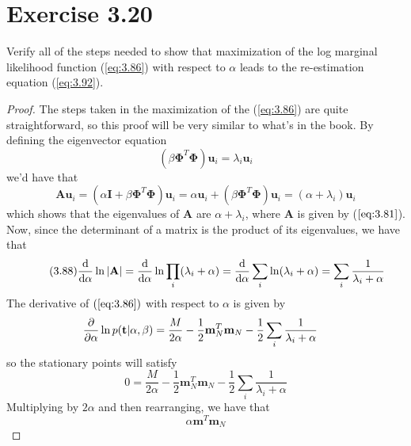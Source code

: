 \section*{Exercise 3.20}
Verify all of the steps needed to show that 
maximization of the log marginal likelihood function (\ref{eq:3.86}) with
respect to $\alpha$ leads to the re-estimation equation (\ref{eq:3.92}).

\vspace{1em}
        
\begin{proof}
    The steps taken in the maximization of the (\ref{eq:3.86})
    are quite straightforward, so this proof will be very similar 
    to what's in the book. By defining the eigenvector equation
    \begin{equation}\label{eq:3.87}\tag{3.87}
        (\beta \mathbf{\Phi}^T\mathbf{\Phi})\mathbf{u}_i = \lambda_i \mathbf{u}_i
    \end{equation}
    we'd have that
    \[
        \mathbf{A}\mathbf{u}_i 
        = (\alpha\mathbf{I} + \beta\mathbf{\Phi}^T\mathbf{\Phi})\mathbf{u}_i
        = \alpha\mathbf{u}_i + (\beta \mathbf{\Phi}^T\mathbf{\Phi})\mathbf{u}_i
        = (\alpha + \lambda_i) \mathbf{u}_i
    \] 
    which shows that the eigenvalues of $\mathbf{A}$ are $\alpha + \lambda_i$,
    where $\mathbf{A}$ is given by ($\ref{eq:3.81}$).
    Now, since the determinant of a matrix is the product of its eigenvalues, 
    we have that
    \begin{equation}\label{eq:3.88}\tag{3.88}
        \dv{\alpha} \ln|\mathbf{A}| 
        = \dv{\alpha} \ln \prod_{i}(\lambda_i + \alpha)
        = \dv{\alpha} \sum_i \ln(\lambda_i + \alpha)
        = \sum_i \frac{1}{\lambda_i + \alpha}
    \end{equation}
    The derivative of $(\ref{eq:3.86})$ with respect to $\alpha$ is given by
    \begin{align*}
        \pdv{\alpha} \ln p(\mathbf{t} | \alpha, \beta)
        &= \frac{M}{2\alpha} - \frac{1}{2} \mathbf{m}_N^T\mathbf{m}_N 
        - \frac{1}{2} \sum_i\frac{1}{\lambda_i + \alpha}
    \end{align*}
    so the stationary points will satisfy
    \begin{equation}\label{eq:3.89}\tag{3.89}
        0 = \frac{M}{2\alpha} - \frac{1}{2} \mathbf{m}_N^T\mathbf{m}_N 
        - \frac{1}{2} \sum_{i} \frac{1}{\lambda_i + \alpha}
    \end{equation}
    Multiplying by $2\alpha$ and then rearranging,
    we have that
    \[
        \alpha \mathbf{m}^T\mathbf{m}_N 
\]
\end{proof}
